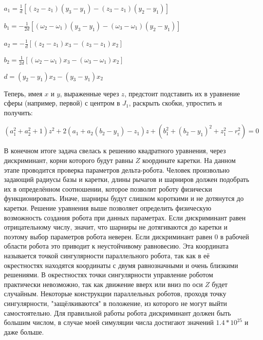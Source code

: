\vspace{0.75cm}
\hspace{4cm} $a_{1} =\frac{1}{d}[(z_{2}-z_{1})(y_{3}-y_{1})-(z_{3}-z_{1})(y_{2}-y_{1})]$

\hspace{4cm} $b_{1} =-\frac{1}{2d}[(\omega_{2}-\omega_{1})(y_{3}-y_{1})-(\omega_{3}-\omega_{1})(y_{2}-y_{1})]$\\
\vspace{0.75cm}

\hspace{4cm} $a_{2} =-\frac{1}{d}[(z_{2}-z_{1})x_{3}-(z_{3}-z_{1})x_{2}]$

\hspace{4cm} $b_{2} =\frac{1}{2d}[(\omega_{2}-\omega_{1})x_{3}-(\omega_{3}-\omega_{1})x_{2}]$

\vspace{0.75cm}
\hspace{4cm} $d=(y_{2}-y_{1})x_{3} - (y_{3}-y_{1})x_{2}$\\
\vspace{0.75cm}

Теперь, имея $x$ и $y$, выраженные через $z$, предстоит подставить их в уравнение сферы (например, первой) с центром в $J_{1}$, раскрыть скобки, упростить и получить:

\begin{center}
$(a^{2}_{1}+a^{2}_{2}+1)z^{2} + 2(a_{1}+a_{2}(b_{2}-y_{1})-z_{1})z +(b^{2}_{1}+(b_{2}-y_{1})^2 +z^{2}_{1}-r^{2}_{e})=0$
\end{center}

В конечном итоге задача свелась к решению квадратного уравнения, через дискриминант, корни которого будут равны $Z$ координате каретки. На данном этапе проводится проверка параметров дельта-робота. Человек произвольно задающий радиусы базы и каретки, длины рычагов и шарниров должен подобрать их в определённом соотношении, которое позволит роботу физически функционировать. Иначе, шарниры будут слишком короткими и не дотянутся до каретки. Решение уравнения выше позволяет определить физическую возможность создания робота при данных параметрах. Если дискриминант равен отрицательному числу, значит, что шарниры не дотягиваются до каретки и поэтому выбор параметров робота неверен. Если дискриминант равен 0 в рабочей области робота это приводит к неустойчивому равновесию. Эта координата называется точкой сингулярности параллельного робота, так как в её окрестностях находятся координаты с двумя равнозначными и очень близкими решениями. В окрестностях точки сингулярности управление роботом практически невозможно, так как движение вверх или вниз по оси $Z$ будет случайным. Некоторые конструкции параллельных роботов, проходя точку сингулярности, "защёлкиваются" в положение, из которого не могут выйти самостоятельно. Для правильной работы робота дискриминант должен быть большим числом, в случае моей симуляции числа достигают значений $1.4*10^{25}$ и даже больше.

